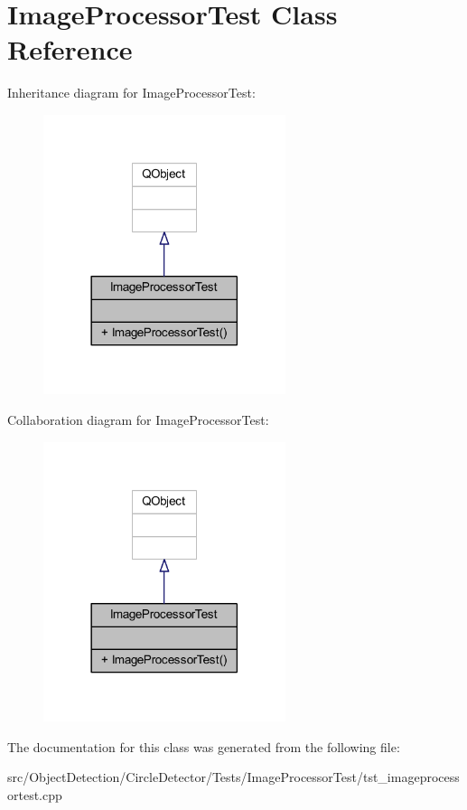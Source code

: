 \hypertarget{class_image_processor_test}{}\section{Image\+Processor\+Test Class Reference}
\label{class_image_processor_test}


Inheritance diagram for Image\+Processor\+Test\+:\nopagebreak
\begin{figure}[H]
\begin{center}
\leavevmode
\includegraphics[width=201pt]{d9/dbb/class_image_processor_test__inherit__graph}
\end{center}
\end{figure}


Collaboration diagram for Image\+Processor\+Test\+:\nopagebreak
\begin{figure}[H]
\begin{center}
\leavevmode
\includegraphics[width=201pt]{d4/d1e/class_image_processor_test__coll__graph}
\end{center}
\end{figure}


The documentation for this class was generated from the following file\+:\begin{DoxyCompactItemize}
\item 
src/\+Object\+Detection/\+Circle\+Detector/\+Tests/\+Image\+Processor\+Test/tst\+\_\+imageprocessortest.\+cpp\end{DoxyCompactItemize}
